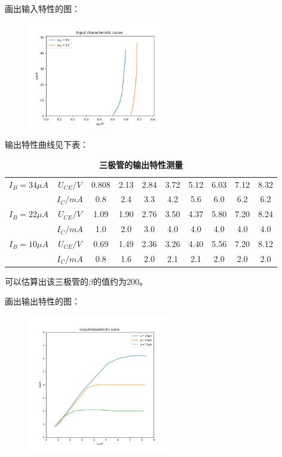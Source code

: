 \documentclass[UTF8]{ctexart}
\begin{document}
画出输入特性的图：
\begin{figure}[htbp]
        \centering
        \includegraphics[width=0.55\textwidth]{输入特性曲线.png}
    \end{figure}

输出特性曲线见下表：

\begin{table}[H]
        \centering
        \caption{\label{表2}\textbf{三极管的输出特性测量}}
        \begin{tabular}{cccccccccc}
        \toprule
        $I_B=34\mu A$ & $U_{CE}/V$ & 0.808 & 2.13 & 2.84 & 3.72 & 5.12 & 6.03 & 7.12 & 8.32 \\
                      & $I_C/mA$   & 0.8   & 2.4 & 3.3 & 4.2 & 5.6 & 6.0 & 6.2 & 6.2 \\
        \midrule
        $I_B = 22\mu A$ & $U_{CE}/V$ & 1.09 & 1.90 & 2.76 & 3.50 & 4.37 & 5.80 & 7.20 & 8.24\\
                        & $I_C/mA$   & 1.0 & 2.0 & 3.0 & 4.0 & 4.0 & 4.0 & 4.0 & 4.0\\
        \midrule
        $I_B = 10\mu A$ & $U_{CE}/V$ & 0.69 & 1.49 & 2.36 & 3.26 & 4.40 & 5.56 & 7.20 & 8.12 \\
                        & $I_C/mA$   &  0.8 & 1.6 & 2.0 & 2.1 & 2.1 & 2.0 &2.0 & 2.0     \\        
        \bottomrule
        \end{tabular}
\end{table}

可以估算出该三极管的$\beta$的值约为200。

画出输出特性的图：
\begin{figure}[htbp]
    \centering
    \includegraphics[width=0.55\textwidth]{输出特性曲线.png}
\end{figure}
\end{document}
